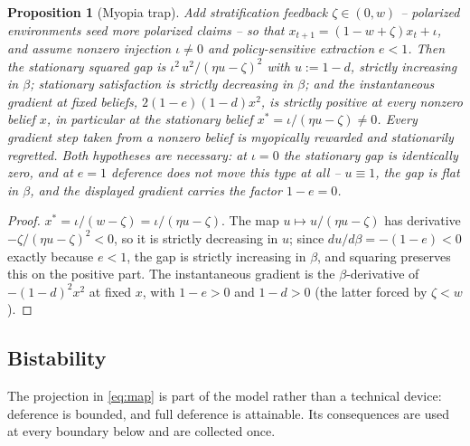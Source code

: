 \documentclass[11pt]{article}
\newtheorem{proposition}[theorem]{Proposition}
\theoremstyle{definition}
\theoremstyle{remark}
\numberwithin{equation}{section}
\begin{document}
\begin{proposition}[Myopia trap]\label{prop:myopia}
Add stratification feedback $\zeta \in (0, w)$ -- polarized environments seed more polarized claims -- so that $x_{t+1} = (1-w+\zeta)x_t + \iota$, and assume nonzero injection $\iota \neq 0$ and policy-sensitive extraction $e < 1$. Then the stationary squared gap is $\iota^2\,u^2/(\eta u - \zeta)^2$ with $u := 1-d$, strictly increasing in $\beta$; stationary satisfaction is strictly decreasing in $\beta$; and the instantaneous gradient at fixed beliefs, $2(1-e)(1-d)x^2$, is strictly positive at every \emph{nonzero} belief $x$, in particular at the stationary belief $x^\ast = \iota/(\eta u - \zeta) \neq 0$. Every gradient step taken from a nonzero belief is myopically rewarded and stationarily regretted. Both hypotheses are necessary: at $\iota = 0$ the stationary gap is identically zero, and at $e = 1$ deference does not move this type at all -- $u \equiv 1$, the gap is flat in $\beta$, and the displayed gradient carries the factor $1-e = 0$.
\end{proposition}
\begin{proof}
$x^\ast = \iota/(w-\zeta) = \iota/(\eta u - \zeta)$. The map $u \mapsto u/(\eta u - \zeta)$ has derivative $-\zeta/(\eta u - \zeta)^2 < 0$, so it is strictly decreasing in $u$; since $du/d\beta = -(1-e) < 0$ exactly because $e < 1$, the gap is strictly increasing in $\beta$, and squaring preserves this on the positive part. The instantaneous gradient is the $\beta$-derivative of $-(1-d)^2x^2$ at fixed $x$, with $1-e > 0$ and $1-d > 0$ (the latter forced by $\zeta < w$).
\end{proof}

\subsection{Bistability}\label{sec:bistable}

The projection in \eqref{eq:map} is part of the model rather than a technical device: deference is bounded, and full deference is attainable. Its consequences are used at every boundary below and are collected once.
\end{document}
